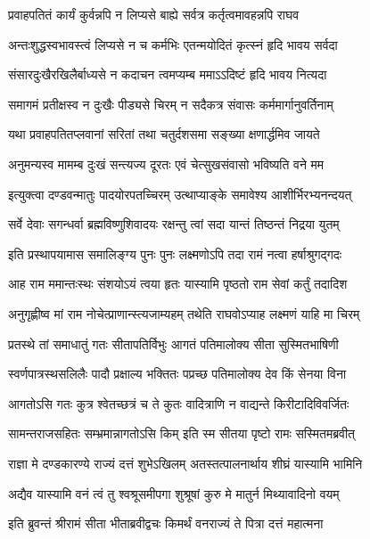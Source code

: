 \twolineshloka
{प्रवाहपतितं कार्यं कुर्वन्नपि न लिप्यसे}
{बाह्ये सर्वत्र कर्तृत्वमावहन्नपि राघव} %

\twolineshloka
{अन्तःशुद्धस्वभावस्त्वं लिप्यसे न च कर्मभिः}
{एतन्मयोदितं कृत्स्नं हृदि भावय सर्वदा} %

\twolineshloka
{संसारदुःखैरखिलैर्बाध्यसे न कदाचन}
{त्वमप्यम्ब ममाऽऽदिष्टं हृदि भावय नित्यदा} %

\twolineshloka
{समागमं प्रतीक्षस्व न दुःखैः पीड्यसे चिरम्}
{न सदैकत्र संवासः कर्ममार्गानुवर्तिनाम्} %

\twolineshloka
{यथा प्रवाहपतितप्लवानां सरितां तथा}
{चतुर्दशसमा सङ्ख्या क्षणार्द्धमिव जायते} %

\twolineshloka
{अनुमन्यस्व मामम्ब दुःखं सन्त्यज्य दूरतः}
{एवं चेत्सुखसंवासो भविष्यति वने मम} %

\twolineshloka
{इत्युक्त्वा दण्डवन्मातुः पादयोरपतच्चिरम्}
{उत्थाप्याङ्के समावेश्य आशीर्भिरभ्यनन्दयत्} %

\twolineshloka
{सर्वे देवाः सगन्धर्वा ब्रह्मविष्णुशिवादयः}
{रक्षन्तु त्वां सदा यान्तं तिष्ठन्तं निद्रया युतम्} %

\twolineshloka
{इति प्रस्थापयामास समालिङ्ग्य पुनः पुनः}
{लक्ष्मणोऽपि तदा रामं नत्वा हर्षाश्रुगद्गदः} %

\twolineshloka
{आह राम ममान्तःस्थः संशयोऽयं त्वया हृतः}
{यास्यामि पृष्ठतो राम सेवां कर्तुं तदादिश} %

\twolineshloka
{अनुगृह्णीष्व मां राम नोचेत्प्राणान्स्त्यजाम्यहम्}
{तथेति राघवोऽप्याह लक्ष्मणं याहि मा चिरम्} %

\twolineshloka
{प्रतस्थे तां समाधातुं गतः सीतापतिर्विभुः}
{आगतं पतिमालोक्य सीता सुस्मितभाषिणी} %

\twolineshloka
{स्वर्णपात्रस्थसलिलैः पादौ प्रक्षाल्य भक्तितः}
{पप्रच्छ पतिमालोक्य देव किं सेनया विना} %

\twolineshloka
{आगतोऽसि गतः कुत्र श्वेतच्छत्रं च ते कुतः}
{वादित्राणि न वाद्यन्ते किरीटादिविवर्जितः} %

\twolineshloka
{सामन्तराजसहितः सम्भ्रमान्नागतोऽसि किम्}
{इति स्म सीतया पृष्टो रामः सस्मितमब्रवीत्} %

\twolineshloka
{राज्ञा मे दण्डकारण्ये राज्यं दत्तं शुभेऽखिलम्}
{अतस्तत्पालनार्थाय शीघ्रं यास्यामि भामिनि} %

\twolineshloka
{अद्यैव यास्यामि वनं त्वं तु श्वश्रूसमीपगा}
{शुश्रूषां कुरु मे मातुर्न मिथ्यावादिनो वयम्} %

\twolineshloka
{इति ब्रुवन्तं श्रीरामं सीता भीताब्रवीद्वचः}
{किमर्थं वनराज्यं ते पित्रा दत्तं महात्मना} %

